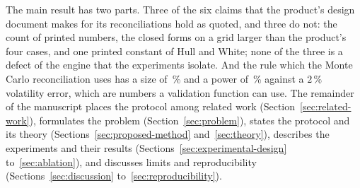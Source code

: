 The main result has two parts. Three of the six claims that the product's design document makes for its reconciliations hold as quoted, and three do not: the count of printed numbers, the closed forms on a grid larger than the product's four cases, and one printed constant of Hull and White; none of the three is a defect of the engine that the experiments isolate. And the rule which the Monte Carlo reconciliation uses has a size of \nSizeProdNetting\,\% and a power of \nPowerProdSigmaTwo\,\% against a $2\,\%$ volatility error, which are numbers a validation function can use. The remainder of the manuscript places the protocol among related work (Section~\ref{sec:related-work}), formulates the problem (Section~\ref{sec:problem}), states the protocol and its theory (Sections~\ref{sec:proposed-method} and~\ref{sec:theory}), describes the experiments and their results (Sections~\ref{sec:experimental-design} to~\ref{sec:ablation}), and discusses limits and reproducibility (Sections~\ref{sec:discussion} to~\ref{sec:reproducibility}).
